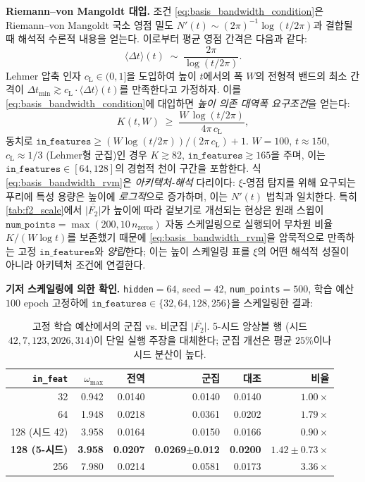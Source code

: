 \documentclass[11pt, a4paper]{article}
\theoremstyle{definition}
\theoremstyle{plain}
\begin{document}
\smallskip
\noindent\textbf{Riemann--von Mangoldt 대입.} 조건 \eqref{eq:basis_bandwidth_condition}은 Riemann--von Mangoldt 국소 영점 밀도 $N'(t)\sim (2\pi)^{-1}\log(t/2\pi)$과 결합될 때 해석적 수론적 내용을 얻는다. 이로부터 평균 영점 간격은 다음과 같다:
\begin{equation}
  \langle\Delta t\rangle(t)\;\sim\;\frac{2\pi}{\log(t/2\pi)}.
\end{equation}
Lehmer 압축 인자 $c_{\mathrm{L}}\in(0,1]$을 도입하여 높이 $t$에서의 폭 $W$의 전형적 밴드의 최소 간격이 $\Delta t_{\min}\gtrsim c_{\mathrm{L}}\cdot\langle\Delta t\rangle(t)$를 만족한다고 가정하자. 이를 \eqref{eq:basis_bandwidth_condition}에 대입하면 \emph{높이 의존 대역폭 요구조건}을 얻는다:
\begin{equation}
  K(t,W)\;\geq\;
  \frac{W\,\log(t/2\pi)}{4\pi\,c_{\mathrm{L}}},
  \label{eq:basis_bandwidth_rvm}
\end{equation}
동치로 $\texttt{in\_features}\geq (W\log(t/2\pi))/(2\pi\,c_{\mathrm{L}})+1$. $W=100$, $t\approx 150$, $c_{\mathrm{L}}\approx 1/3$ (Lehmer형 군집)인 경우 $K\gtrsim 82$, $\texttt{in\_features}\gtrsim 165$을 주며, 이는 $\texttt{in\_features}\in[64,128]$의 경험적 천이 구간을 포함한다. 식 \eqref{eq:basis_bandwidth_rvm}은 \emph{아키텍처-해석} 다리이다: $\xi$-영점 탐지를 위해 요구되는 푸리에 특성 용량은 높이에 \emph{로그적}으로 증가하며, 이는 $N'(t)$ 법칙과 일치한다. 특히 \cref{tab:f2_scale}에서 $\overline{|F_2|}$가 높이에 따라 겉보기로 개선되는 현상은 원래 스윕이 $\texttt{num\_points}=\max(200,10\,n_{\mathrm{zeros}})$ 자동 스케일링으로 실행되어 무차원 비율 $K/(W\log t)$를 보존했기 때문에 \eqref{eq:basis_bandwidth_rvm}을 암묵적으로 만족하는 고정 $\texttt{in\_features}$와 \emph{양립}한다; 이는 높이 스케일링 표를 $\xi$의 어떤 해석적 성질이 아니라 아키텍처 조건에 연결한다.

\smallskip
\noindent\textbf{기저 스케일링에 의한 확인.} \texttt{hidden}$=64$, seed$=42$, \texttt{num\_points}$=500$, 학습 예산 $100$ epoch 고정하에 $\texttt{in\_features}\in\{32,64,128,256\}$을 스케일링한 결과:

\begin{table}[ht]
\centering
\caption{고정 학습 예산에서의 군집 vs. 비군집 $\overline{|F_2|}$. 5-시드 앙상블 행 (시드 $42,7,123,2026,314$)이 단일 실행 주장을 대체한다; 군집 개선은 평균 $25\%$이나 시드 분산이 높다.}
\label{tab:basis_scaling}
\small
\begin{tabular}{rrrrrr}
\toprule
\texttt{in\_feat} & $\omega_{\max}$ & 전역 &
  군집 & 대조 & 비율 \\
\midrule
32   & 0.942 & 0.0140 & 0.0140 & 0.0140 & $1.00\times$ \\
64   & 1.948 & 0.0218 & 0.0361 & 0.0202 & $1.79\times$ \\
128 (시드 42)  & 3.958 & 0.0164 &
  0.0150 & 0.0166 & $0.90\times$ \\
\textbf{128 (5-시드)} & \textbf{3.958} & \textbf{0.0207} &
  \textbf{0.0269}$\pm$\textbf{0.012} & \textbf{0.0200} & $\mathbf{1.42\pm0.73\times}$ \\
256  & 7.980 & 0.0214 & 0.0581 & 0.0173 & $3.36\times$ \\
\bottomrule
\end{tabular}
\end{table}
\end{document}
